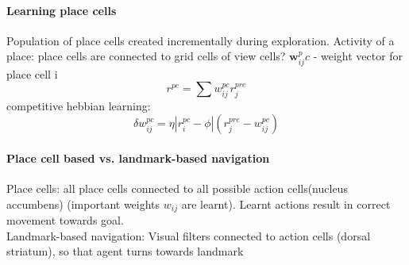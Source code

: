 \documentclass[11pt]{article}
\newcommand\abs[1]{\left|#1\right|}
\begin{document}
\paragraph{Learning place cells} Population of place cells created incrementally during exploration. Activity of a place:
place cells are connected to grid cells of view cells?
$\mathbf{w}_{ij}^pc$ - weight vector for place cell i
\[
r^{pc}=\sum w_{ij}^{pc}r_j^{pre}
\]
competitive hebbian learning:
\[
\delta w_{ij}^{pc}=\eta \abs{r_i^{pc}-\phi}(r_j^{pre}-w_{ij}^{pc})
\]
\paragraph{Place cell based vs. landmark-based navigation}
Place cells: all place cells connected to all possible action cells(nucleus accumbens) (important weights $w_{ij}$ are learnt). Learnt actions result in correct movement towards goal.\\
Landmark-based navigation: Visual filters connected to action cells (dorsal striatum), so that agent turns towards landmark


\end{document}
